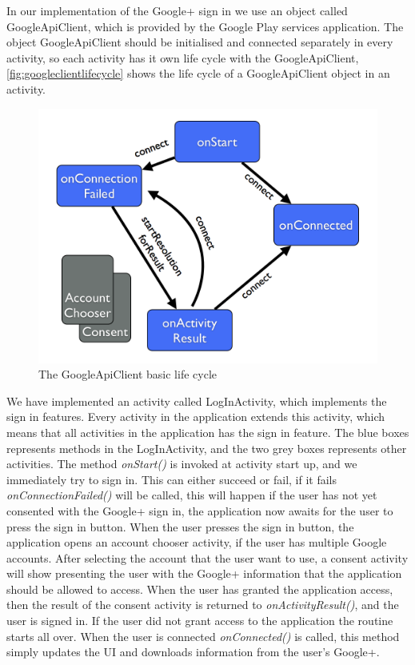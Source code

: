 In our implementation of the Google+ sign in we use an object called \\GoogleApiClient\citep{googleapiclient-docs}, which is provided by the Google Play services application. 
The object GoogleApiClient should be initialised and connected separately in every activity, so each activity has it own life cycle with the GoogleApiClient, \autoref{fig:googleclientlifecycle} shows the life cycle of a GoogleApiClient object in an activity.
\begin{figure}[H]
\centering
\includegraphics[width=0.75\linewidth]{img/googleclientflow.png}
\caption{The GoogleApiClient basic life cycle\cite{googleapiclient-lifecycle}}
\label{fig:googleclientlifecycle}
\end{figure}
We have implemented an activity called LogInActivity, which implements the sign in features. Every activity in the application extends this activity, which means that all activities in the application has the sign in feature. 
The blue boxes represents methods in the LogInActivity, and the two grey boxes represents other activities. The method \textit{onStart()} is invoked at activity start up, and we immediately try to sign in. 
This can either succeed or fail, if it fails \textit{onConnectionFailed()} will be called, this will happen if the user has not yet consented with the Google+ sign in, the application now awaits for the user to press the sign in button. 
When the user presses the sign in button, the application opens an account chooser activity, if the user has multiple Google accounts. 
After selecting the account that the user want to use, a consent activity will show presenting the user with the Google+ information that the application should be allowed to access. 
When the user has granted the application access, then the result of the consent activity is returned to \textit{onActivityResult()}, and the user is signed in. 
If the user did not grant access to the application the routine starts all over. When the user is connected \textit{onConnected()} is called, this method simply updates the UI and downloads information from the user's Google+. 

